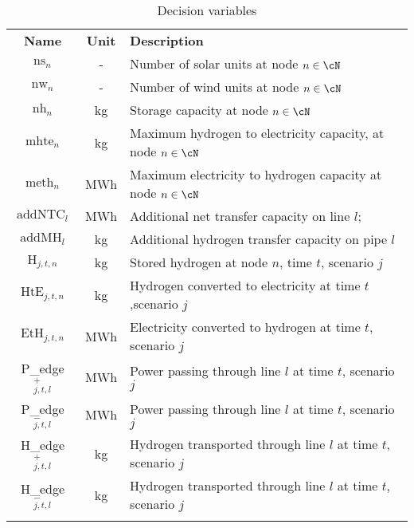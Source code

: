 \begin{table}
  \caption{Decision variables}
  \label{table_vars}       %
  \begin{tabularx}{\textwidth}{ccl}
  \hline\noalign{\smallskip}
  \textbf{Name} & \textbf{Unit} & \textbf{Description}  \\
  \noalign{\smallskip}\hline\noalign{\smallskip}
  $\text{ns}_n$ & - & Number of solar units at node $n \in \cN$ \\
  $\text{nw}_n$ & - & Number of wind units at node $n \in \cN$ \\
  $\text{nh}_n$ & kg & Storage capacity at node $n \in \cN$\\
  $\text{mhte}_n$ & kg & \parbox[t]{0.70\textwidth}{Maximum hydrogen to electricity capacity,  at node $n \in \cN$} \\
  $\text{meth}_n$ & MWh & Maximum electricity to hydrogen capacity at node $n \in \cN$\\
  $\text{addNTC}_l$ & MWh & Additional net transfer capacity on line $l$;\\
  $\text{addMH}_l$ & kg & Additional hydrogen transfer capacity on pipe $l$\\
  \noalign{\smallskip}\hline\noalign{\smallskip}
  $\text{H}_{j,t,n}$ & kg& Stored hydrogen at node $n$, time \(t\), scenario \(j\)\\
  $\text{HtE}_{j,t,n}$ & kg& Hydrogen converted to electricity at time \(t\),scenario \(j\) \\
  $\text{EtH}_{j,t,n}$ & MWh& Electricity converted to hydrogen at time \(t\), scenario \(j\)\\
  P\_edge$^+_{j,t,l}$&MWh& Power passing through line $l$ at time $t$, scenario $j$ \\
  P\_edge$^-_{j,t,l}$&MWh& Power passing through line $l$ at time $t$, scenario $j$ \\
  H\_edge$^+_{j,t,l}$&kg& Hydrogen transported through line $l$ at time $t$, scenario $j$\\
  H\_edge$^-_{j,t,l}$&kg& Hydrogen transported through line $l$ at time $t$, scenario $j$\\
  \noalign{\smallskip}\hline
  \end{tabularx}
  \end{table}
  



